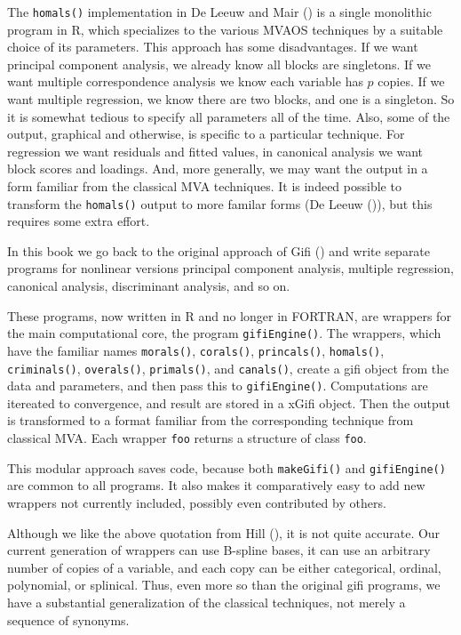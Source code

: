 \documentclass[
  12pt,
  letterpaper,
]{scrbook}
\begin{document}
The \texttt{homals()} implementation in De Leeuw and Mair
() is a single monolithic program
in R, which specializes to the various MVAOS techniques by a suitable
choice of its parameters. This approach has some disadvantages. If we
want principal component analysis, we already know all blocks are
singletons. If we want multiple correspondence analysis we know each
variable has \(p\) copies. If we want multiple regression, we know there
are two blocks, and one is a singleton. So it is somewhat tedious to
specify all parameters all of the time. Also, some of the output,
graphical and otherwise, is specific to a particular technique. For
regression we want residuals and fitted values, in canonical analysis we
want block scores and loadings. And, more generally, we may want the
output in a form familiar from the classical MVA techniques. It is
indeed possible to transform the \texttt{homals()} output to more
familar forms (De Leeuw ()), but this
requires some extra effort.

In this book we go back to the original approach of Gifi
() and write separate programs for
nonlinear versions principal component analysis, multiple regression,
canonical analysis, discriminant analysis, and so on.

These programs, now written in R and no longer in FORTRAN, are wrappers
for the main computational core, the program \texttt{gifiEngine()}. The
wrappers, which have the familiar names \texttt{morals()},
\texttt{corals()}, \texttt{princals()}, \texttt{homals()},
\texttt{criminals()}, \texttt{overals()}, \texttt{primals()}, and
\texttt{canals()}, create a gifi object from the data and parameters,
and then pass this to \texttt{gifiEngine()}. Computations are itereated
to convergence, and result are stored in a xGifi object. Then the output
is transformed to a format familiar from the corresponding technique
from classical MVA. Each wrapper \texttt{foo} returns a structure of
class \texttt{foo}.

This modular approach saves code, because both \texttt{makeGifi()} and
\texttt{gifiEngine()} are common to all programs. It also makes it
comparatively easy to add new wrappers not currently included, possibly
even contributed by others.

Although we like the above quotation from Hill
(), it is not quite accurate. Our current
generation of wrappers can use B-spline bases, it can use an arbitrary
number of copies of a variable, and each copy can be either categorical,
ordinal, polynomial, or splinical. Thus, even more so than the original
gifi programs, we have a substantial generalization of the classical
techniques, not merely a sequence of synonyms.
\end{document}
